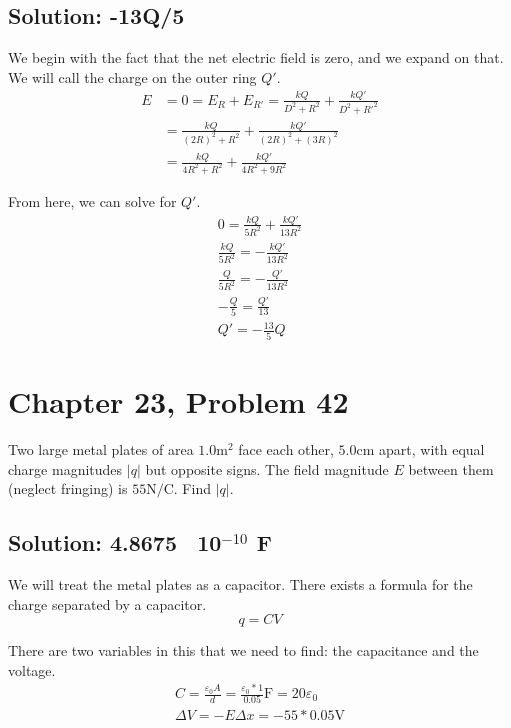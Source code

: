 \documentclass[12pt]{article}
\begin{document}
\subsection*{Solution: -13Q/5}
We begin with the fact that the net electric field is zero, and we expand on that.
We will call the charge on the outer ring $Q'$.
\begin{align*}
    E   &=  0
        =   E_R + E_{R'}
        =   \frac{kQ}{D^2 + R^2} + \frac{kQ'}{D^2 + R'^2}\\
        &=  \frac{kQ}{(2R)^2 + R^2} + \frac{kQ'}{(2R)^2 + (3R)^2}\\
        &=  \frac{kQ}{4R^2 + R^2} + \frac{kQ'}{4R^2 + 9R^2}
\end{align*}

From here, we can solve for $Q'$.
\begin{gather*}
    0   =   \frac{kQ}{5R^2} + \frac{kQ'}{13R^2}\\
    \frac{kQ}{5R^2}  =   -\frac{kQ'}{13R^2}\\
    \frac{Q}{5R^2}  =   -\frac{Q'}{13R^2}\\
    -\frac{Q}{5}  =   \frac{Q'}{13}\\
    Q'  =   \boxed{-\frac{13}{5}Q}
\end{gather*}
\pagebreak
\section{Chapter 23, Problem 42}
Two large metal plates of area $1.0 \unit{\meter^2}$ face each other, $5.0 \unit{\centi\meter}$ apart, with equal charge magnitudes $|q|$ but opposite signs. The field magnitude $E$ between them (neglect fringing) is $55 \unit{\newton/\coulomb}$. Find $|q|$.

\subsection*{Solution: 4.8675 \texttimes\ 10$^{-10}$ F}
We will treat the metal plates as a capacitor.
There exists a formula for the charge separated by a capacitor.
\[
    q   =   CV
\]

There are two variables in this that we need to find: the capacitance and the voltage.
\begin{gather*}
    C   =   \frac{\varepsilon_0 A}{d} = \frac{\varepsilon_0 * 1}{0.05} \unit{\farad}
        =   20\varepsilon_0\\
    \Delta V    =   -E \Delta x
        =   -55 * 0.05 \unit{\volt}
\end{gather*}
\end{document}
